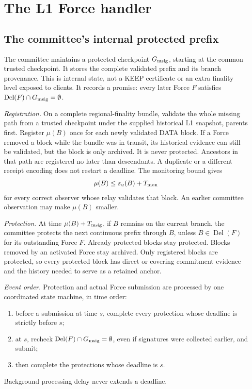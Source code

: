 \documentclass[11pt,a4paper]{article}
\newif\ifrevmarks
\newcommand{\Rv}[1]{\ifrevmarks\leavevmode{\color{rvBlue}#1}\else#1\fi}
\newcommand{\Cid}[1]{\ifrevmarks\textsuperscript{\hyperlink{chg:#1}{\color{rvBlue}\sffamily\scriptsize#1}}\fi}
\newcommand{\Del}{\operatorname{Del}}
\begin{document}
\section{The L1 Force handler}
\label{sec:force}

\subsection{The committee's internal protected prefix}
\label{sec:protection}
The committee maintains a protected checkpoint $G_{\rm msig}$, starting
at the common trusted checkpoint. It stores the complete validated
prefix and its branch provenance. This is internal state, not a KEEP
certificate or an extra finality level exposed to clients.
\Rv{It records a promise: every later Force $F$ satisfies
$\Del(F)\cap G_{\rm msig}=\emptyset$.}

\Rv{\emph{Registration.}} On a complete regional-finality bundle, validate the whole missing path
from a trusted checkpoint under the supplied historical L1 snapshot,
parents first. Register \Rv{$\mu(B)$} once for each newly validated DATA block.
If a Force removed a block while the bundle was in transit, its historical
evidence can still be validated, but the block is only archived. It is
never protected. Ancestors in that path are registered no
later than descendants. A duplicate or a different receipt encoding
does not restart a deadline. The monitoring bound gives
\[
 \Rv{\mu(B)}\le s_u(B)+T_{\rm mon}
\]
for every correct observer whose relay validates that block. An earlier
committee observation may make \Rv{$\mu(B)$} smaller.

\Rv{\emph{Protection.}} At time \Rv{$\mu(B)+T_{\rm msig}$}, if $B$ remains on the \Rv{current} branch,
the committee protects the next continuous prefix through $B$, unless
\Rv{$B\in\Del(F)$ for its outstanding Force $F$}. Already protected blocks
stay protected. Blocks removed by an activated Force stay archived.
\Rv{Only registered blocks are protected, so every} protected block has direct or covering commitment
evidence and the history needed to serve as a retained anchor.

\Rv{\emph{Event order.} Protection and actual Force submission
are processed by one coordinated state machine, in time order:}
\begin{enumerate}[label=(\arabic*)]
\item \Rv{before a submission at time $s$, complete every protection
whose deadline is strictly before $s$;}
\item \Rv{at $s$, recheck $\Del(F)\cap G_{\rm msig}=\emptyset$, even if
signatures were collected earlier, and submit;}
\item \Rv{then complete the protections whose deadline is $s$.}
\end{enumerate}
Background processing delay never extends a deadline.
\end{document}
